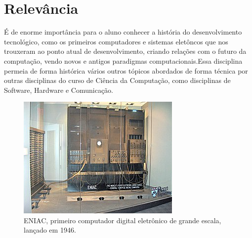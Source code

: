 \documentclass[a4paper, 12pt]{article}
\begin{document}
\section{Relevância}
É de enorme importância para o aluno conhecer a história do desenvolvimento tecnológico, como os primeiros computadores e sistemas eletôncos que nos trouxeram ao ponto atual de desenvolvimento, criando relações com o futuro da computação, vendo novos e antigos paradigmas computacionais.\newpage Essa disciplina permeia de forma histórica vários outros tópicos abordados de forma técnica por outras disciplinas do curso de Ciência da Computação, como disciplinas de Software, Hardware e Comunicação.
\begin{figure}[h!]
\centering
\includegraphics[scale=0.8]{eniac.jpg}
\caption{ENIAC, primeiro computador digital eletrônico de grande escala, lançado em 1946.\cite{eniac}}
\label{fig:eniac.jpg}
\end{figure}





\end{document}
